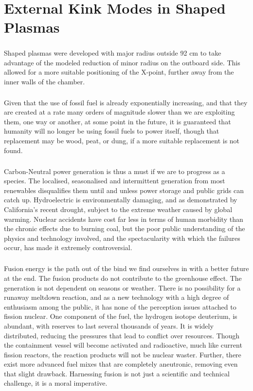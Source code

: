 \chapter{External Kink Modes in Shaped Plasmas}
\paragraph{} Shaped plasmas were developed with major radius outside 92 cm to take advantage of the modeled reduction of minor radius on the outboard side.  This allowed for a more suitable positioning of the X-point, further away from the inner walls of the chamber.
\paragraph{}
Given that the use of fossil fuel is already exponentially increasing, and that they are created at a rate many orders of magnitude slower than we are exploiting them, one way or another, at some point in the future, it is guaranteed that humanity will no longer be using fossil fuels to power itself, though that replacement may be wood, peat, or dung, if a more suitable replacement is not found.
\paragraph{}
Carbon-Neutral power generation is thus a must if we are to progress as a species.  The localised, seasonalised and intermittent generation from most renewables disqualifies them until and unless power storage and public grids can catch up.  Hydroelectric is environmentally damaging, and as demonstrated by California's recent drought, subject to the extreme weather caused by global warming.  Nuclear accidents have cost far less in terms of human morbidity than the chronic effects due to burning coal, but the poor public understanding of the physics and technology involved, and the spectacularity with which the failures occur, has made it extremely controversial.
\paragraph{}
Fusion energy is the path out of the bind we find ourselves in with a better future at the end.  The fusion products do not contribute to the greenhouse effect.  The generation is not dependent on seasons or weather.  There is no possibility for a runaway meltdown reaction, and as a new technology with a high degree of enthusiasm among the public, it has none of the perception issues attached to fission nuclear.  One component of the fuel, the hydrogen isotope deuterium, is abundant, with reserves to last several thousands of years.  It is widely distributed, reducing the pressures that lead to conflict over resources.    Though the containment vessel will become activated and radioactive, much like current fission reactors, the reaction products will not be nuclear waster.  Further, there exist more advanced fuel mixes that are completely aneutronic, removing even that slight drawback.  Harnessing fusion is not just a scientific and technical challenge, it is a moral imperative.

